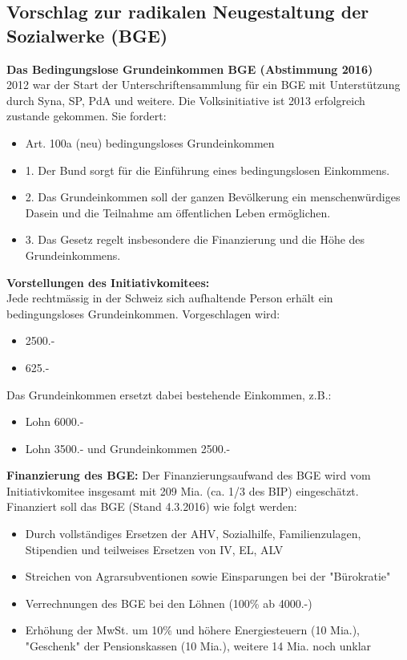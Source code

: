 \subsection{Vorschlag zur radikalen Neugestaltung der Sozialwerke (BGE)}
\textbf{Das Bedingungslose Grundeinkommen BGE (Abstimmung 2016)}\\
2012 war der Start der Unterschriftensammlung für ein BGE mit Unterstützung durch Syna, SP, PdA und weitere. Die Volksinitiative ist 2013 erfolgreich zustande gekommen. Sie fordert:
\begin{itemize}
	\item[\-] Art. 100a (neu) bedingungsloses Grundeinkommen
	\item[\-] 1. Der Bund sorgt für die Einführung eines bedingungslosen Einkommens.
	\item[\-] 2. Das Grundeinkommen soll der ganzen Bevölkerung ein menschenwürdiges Dasein und die Teilnahme am öffentlichen Leben ermöglichen.
	\item[\-] 3. Das Gesetz regelt insbesondere die Finanzierung und die Höhe des Grundeinkommens.
\end{itemize}
\textbf{Vorstellungen des Initiativkomitees:}\\
Jede rechtmässig in der Schweiz sich aufhaltende Person erhält ein bedingungsloses Grundeinkommen. Vorgeschlagen wird:
\begin{itemize}
	\item{} 2500.-
	\item{} 625.-
\end{itemize}
Das Grundeinkommen ersetzt dabei bestehende Einkommen, z.B.:
\begin{itemize}
	\item{} Lohn 6000.-
	\item{} Lohn 3500.- und Grundeinkommen 2500.-
\end{itemize}
\textbf{Finanzierung des BGE:}
Der Finanzierungsaufwand des BGE wird vom Initiativkomitee insgesamt mit 209 Mia. (ca. 1/3 des BIP) eingeschätzt.\\
Finanziert soll das BGE (Stand 4.3.2016) wie folgt werden:
\begin{itemize}
	\item{} Durch vollständiges Ersetzen der AHV, Sozialhilfe, Familienzulagen, Stipendien und teilweises Ersetzen von IV, EL, ALV
	\item{} Streichen von Agrarsubventionen sowie Einsparungen bei der "Bürokratie"
	\item{} Verrechnungen des BGE bei den Löhnen (100\% ab 4000.-)
	\item{} Erhöhung der MwSt. um 10\% und höhere Energiesteuern (10 Mia.), "Geschenk" der Pensionskassen (10 Mia.), weitere 14 Mia. noch unklar
\end{itemize}
\clearpage
\pagebreak